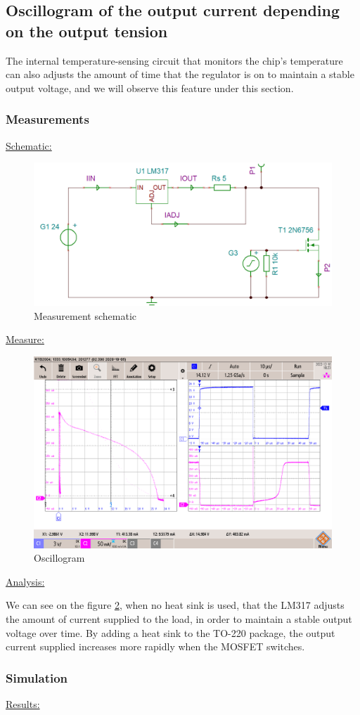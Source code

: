 \subsection{Oscillogram of the output current depending on the output tension} \label{ssec:num13}
The internal temperature-sensing circuit that monitors the chip's temperature can also adjusts the amount of time that the regulator is on to maintain a stable output voltage, and we will observe this feature under this section.
{
	\subsubsection{Measurements}
	\underline{Schematic:}
	\begin{figure}[h]
		\centering
		\includegraphics[width=0.5\linewidth]{../../schemaMesurePulses}
		\caption{Measurement schematic}
		\label{fig:schemamesurepulses}
	\end{figure}

\underline{Measure:}
\begin{figure}[h]
	\centering
	\includegraphics[width=0.5\linewidth]{../../mesure_osciollogramme}
	\caption{Oscillogram}
	\label{fig:mesureosciollogramme}
\end{figure}


\underline{Analysis:}

We can see on the figure \ref{fig:mesureosciollogramme}, when no heat sink is used, that the LM317 adjusts the amount of current supplied to the load, in order to maintain a stable output voltage over time. By adding a heat sink to the TO-220 package, the output current supplied increases more rapidly when the MOSFET switches. 

\clearpage
\subsubsection{Simulation}
\underline{Results:}

}
